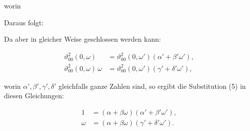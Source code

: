 
worin


Daraus folgt:


Da aber in gleicher Weise geschlossen werden kann:

\[
\begin{aligned}
\vartheta_{00}^2(0,\omega) &= \vartheta_{00}^2(0,\omega')(\alpha'+\beta'\omega'),\\
\vartheta_{00}^2(0,\omega)\,\omega &= \vartheta_{00}^2(0,\omega')(\gamma'+\delta'\omega'),
\end{aligned}
\]

worin $\alpha',\beta',\gamma',\delta'$ gleichfalls ganze Zahlen sind, so ergibt die Substitution (5) in diesen Gleichungen:

\[
\begin{aligned}
1 &= (\alpha+\beta\omega)(\alpha'+\beta'\omega'),\\
\omega &= (\alpha+\beta\omega)(\gamma'+\delta'\omega').
\end{aligned}
\]
